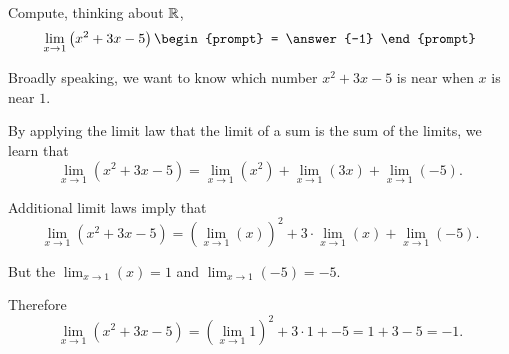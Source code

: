 \documentclass{ximera}
\author{Gregory Hartman \and Matthew Carr}
\begin{document}
\begin{exercise}


  Compute, thinking about $\mathbb R$,
  \[
  \lim_{x\to 1} \left( x^2+3x-5 \right)
  \begin{prompt}
    = \answer{-1}
  \end{prompt}
  \]
  
  \begin{hint}
    Broadly speaking, we want to know which number $x^2+3x-5$ is near
    when $x$ is near $1$.
  \end{hint}
  
  \begin{hint}
    By applying the limit law that the limit of a sum is the sum of the limits, we learn that
    \[
    \lim_{x\to 1} \left( x^2+3x-5 \right)  
    = \lim_{x\to 1} \left( x^2 \right) +
    \lim_{x\to 1} \left( 3x \right) +
    \lim_{x\to 1} \left( -5 \right).
    \]
  \end{hint}
  
  \begin{hint}
    Additional limit laws imply that
    \[
    \lim_{x\to 1} \left( x^2+3x-5 \right)  
    = \left( \lim_{x\to 1} \left( x \right) \right)^2 +
    3 \cdot \lim_{x\to 1} \left( x \right) +
    \lim_{x\to 1} \left( -5 \right).
    \]
  \end{hint}
  
  \begin{hint}
    But the $\lim_{x\to 1} \left( x \right) = 1$ and $\lim_{x\to 1} \left( -5 \right) = -5$.
  \end{hint}
  
  \begin{hint}
    Therefore
    \[
    \lim_{x\to 1} \left( x^2+3x-5 \right)  
    = \left( \lim_{x\to 1} 1 \right)^2 +
    3 \cdot 1 + 
    -5 = 1 + 3 - 5 = -1.
    \]
  \end{hint}
  
\end{exercise}
\end{document}
